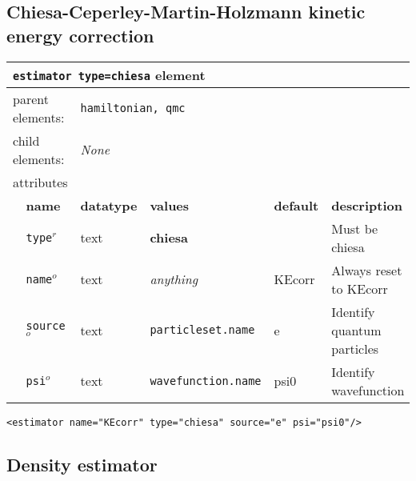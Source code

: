 \subsection{Chiesa-Ceperley-Martin-Holzmann kinetic energy correction}


\FloatBarrier
\begin{table}[h]
\begin{center}
\begin{tabularx}{\textwidth}{l l l l l l }
\hline
\multicolumn{6}{l}{\texttt{estimator type=chiesa} element} \\
\hline
\multicolumn{2}{l}{parent elements:} & \multicolumn{4}{l}{\texttt{hamiltonian, qmc}}\\
\multicolumn{2}{l}{child  elements:} & \multicolumn{4}{l}{\textit{None}}\\
\multicolumn{2}{l}{attributes}  & \multicolumn{4}{l}{}\\
   &   \bfseries name     & \bfseries datatype & \bfseries values & \bfseries default   & \bfseries description \\
   & \texttt{type}$^r$    &  text              & \textbf{chiesa}            &        & Must be chiesa         \\
   & \texttt{name}$^o$    &  text              & \textit{anything}          & KEcorr & Always reset to KEcorr \\
   & \texttt{source}$^o$  &  text              & \texttt{particleset.name}  & e      & Identify quantum particles\\
   & \texttt{psi}$^o$     &  text              & \texttt{wavefunction.name} & psi0   & Identify wavefunction  \\
  \hline
\end{tabularx}
\end{center}
\end{table}
\FloatBarrier

\begin{lstlisting}[caption=``Chiesa'' kinetic energy finite size post-correction.]
   <estimator name="KEcorr" type="chiesa" source="e" psi="psi0"/>
\end{lstlisting}



\subsection{Density estimator}


